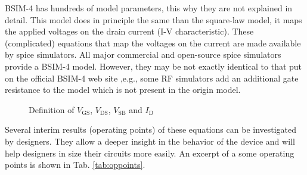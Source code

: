 \documentclass{article}[11pt]
\begin{document}
\notetitle

BSIM-4 has hundreds of model parameters, this why they are not explained in 
detail.
This model does in principle the same than the square-law 
model\cite{mosfet-square-law}, it maps the applied voltages on the drain 
current (I-V characteristic). 
These (complicated) equations that map the voltages on the current are made 
available by \gls{spice} simulators.
All major commercial and open-source \gls{spice} simulators provide a 
BSIM-4 model. 
However, they may be not exactly identical to that put on the official 
BSIM-4 web site \cite{liu-mosfetmodel-01} ,e.g., some RF simulators add an 
additional gate resistance to the model which is not present in the origin model.


\begin{figure}[H]
  \centering
  \begin{circuitikz}
    
  \end{circuitikz}
  \caption{Definition of $V_{\mathrm{GS}}$, $V_{\mathrm{DS}}$, $V_{\mathrm{SB}}$ and $I_{\mathrm{D}}$}
  \label{fig:testbench}
\end{figure}


Several interim results (operating points) of these equations can be 
investigated by designers.
They allow a deeper insight in the behavior of the device and will help 
designers in size their circuits more easily.
An excerpt of a some operating points is shown in Tab. \ref{tab:oppoints}.
\end{document}
